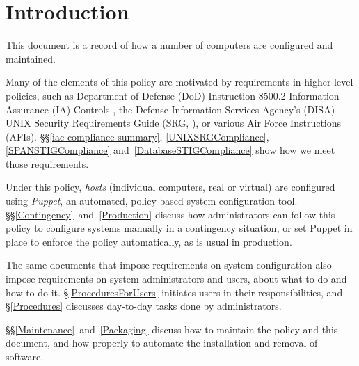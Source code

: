 %
%
%
\chapter{Introduction}
\label{Introduction}

This document is a record of how a number of computers are configured and
maintained. 

Many of the elements of this policy are motivated by requirements in
higher-level policies, such as Department of Defense (DoD) Instruction
8500.2 Information Assurance (IA) Controls \cite{dodi-8500-2}, the Defense
Information Services Agency's (DISA) UNIX Security Requirements Guide
(SRG, \cite{unix-srg}), or various Air Force Instructions (AFIs).
\S\S\ref{iac-compliance-summary}, \ref{UNIXSRGCompliance},
\ref{SPANSTIGCompliance} and~\ref{DatabaseSTIGCompliance} show how we meet
those requirements.

Under this policy, \emph{hosts} (individual computers, real or virtual)
are configured using \emph{Puppet}, an automated, policy-based
system configuration tool.  \S\S\ref{Contingency}~and~\ref{Production}
discuss how administrators can follow this policy to configure systems
manually in a contingency situation, or set Puppet in place to enforce the
policy automatically, as is usual in production.

The same documents that impose requirements on system configuration also
impose requirements on system administrators and users, about what to do
and how to do it. \S\ref{ProceduresForUsers} initiates users in their
responsibilities, and \S\ref{Procedures} discusses day-to-day tasks done
by administrators.

\S\S\ref{Maintenance}~and~\ref{Packaging} discuss how to maintain the
policy and this document, and how properly to automate the installation
and removal of software.

